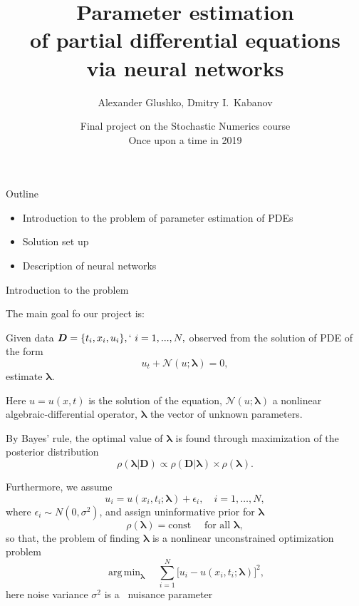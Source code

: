 \documentclass{beamer}
\title{Parameter estimation\\of partial differential equations\\via neural networks}
\author{Alexander Glushko, Dmitry I.\ Kabanov}
\date{Final project on the Stochastic Numerics course\\Once upon a time in 2019}
\newcommand{\Data}{\vec{D}}
\renewcommand{\vec}[1]{\boldsymbol{#1}}
\newcommand{\VLambda}{\ensuremath{\vec{\lambda}}}
\DeclareMathOperator*{\argmin}{arg\,min}
\newcommand{\NonlinOp}{\mathcal N\!}
\begin{document}
\maketitle

\begin{frame}{Outline}
\begin{itemize}
    \item Introduction to the problem of parameter estimation of PDEs
    \item Solution set up
    \item Description of neural networks
\end{itemize}
\end{frame}

\begin{frame}{Introduction to the problem}

The main goal fo our project is:

Given data $\vec{D} = \{t_i, x_i, u_i\},`~i = 1, ..., N,$ observed from the solution of PDE of the form
\begin{equation*}
    \label{eq:pde}
    u_t + \mathcal N\!(u; \VLambda) = 0,
\end{equation*}
estimate $\VLambda$.

Here $u=u(x, t)$ is the solution of the equation,
$\NonlinOp(u; \VLambda)$ a nonlinear algebraic-differential operator,
$\VLambda$ the vector of unknown parameters.

\end{frame}

\begin{frame}

By Bayes' rule, the optimal value of $\VLambda$ is found through
maximization of the posterior distribution \cite{sivia2006data}
\begin{equation*}
    \rho( \VLambda | \Data ) \propto
    \rho( \Data | \VLambda ) \times \rho( \VLambda ).
\end{equation*}

Furthermore, we assume
\begin{equation*}
    u_i = u(x_i, t_i; \VLambda) + \epsilon_i, \quad i=1, \dots, N,
\end{equation*}
where $\epsilon_i \sim N(0, \sigma^2)$, and assign uninformative prior for $\VLambda$
\begin{equation*}
    \rho(\vec{\lambda}) = \text{const} \quad \text{ for all } \vec{\lambda},
\end{equation*}
so that, the problem of finding $\VLambda$ is a nonlinear unconstrained
optimization problem
\begin{equation*}
    \label{eq:optim-ideal}
    \argmin_{\VLambda} \quad 
     \sum_{i=1}^{N} \big[ u_i - u(x_i, t_i; \VLambda) \big]^2,
\end{equation*}
here noise variance $\sigma^2$ is a~
nuisance parameter~\cite[section~8.2]{sivia2006data}
    
\end{frame}
\end{document}

